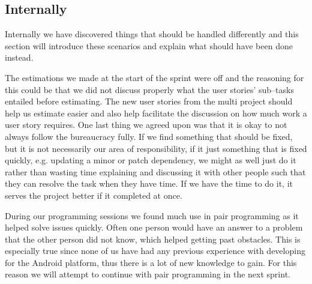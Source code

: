 \subsection{Internally}
Internally we have discovered things that should be handled differently and this section will introduce these scenarios and explain what should have been done instead.

The estimations we made at the start of the sprint were off and the reasoning for this could be that we did not discuss properly what the user stories' sub--tasks entailed before estimating.
The new user stories from the multi project should help us estimate easier and also help facilitate the discussion on how much work a user story requires.
One last thing we agreed upon was that it is okay to not always follow the bureaucracy fully.
If we find something that should be fixed, but it is not necessarily our area of responsibility, if it just something that is fixed quickly, e.g. updating a minor or patch dependency, we might as well just do it rather than wasting time explaining and discussing it with other people such that they can resolve the task when they have time.
If we have the time to do it, it serves the project better if it completed at once.

During our programming sessions we found much use in pair programming as it helped solve issues quickly.
Often one person would have an answer to a problem that the other person did not know, which helped getting past obstacles.
This is especially true since none of us have had any previous experience with developing for the Android platform, thus there is a lot of new knowledge to gain.
For this reason we will attempt to continue with pair programming in the next sprint.
